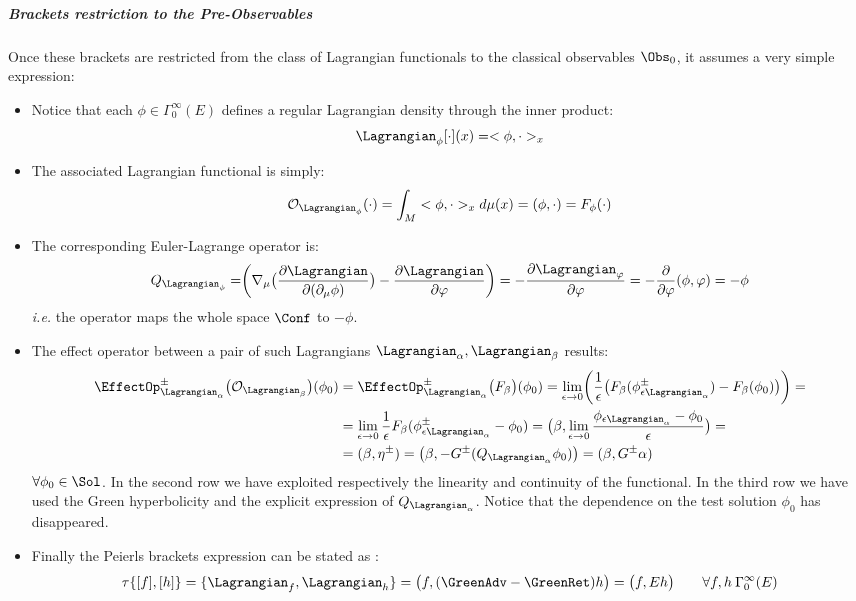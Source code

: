 \documentclass[Main]{subfiles}
\begin{document}
			\subparagraph{Brackets restriction to the Pre-Observables}
				Once these brackets are restricted from the class of Lagrangian functionals to the classical observables $\Obs_0$, it assumes a very simple expression:
				\begin{itemize}
					\item Notice that each $\phi \in \Gamma_0^\infty(E)$ defines a regular Lagrangian density through the inner product:
						\begin{displaymath}
							\Lagrangian_\phi[\cdot](x) = <\phi, \cdot>_x
						\end{displaymath}
					\item The associated Lagrangian functional is simply:
						\begin{displaymath}
							\mathcal{O}_{\Lagrangian_\phi} (\cdot ) = \int_M  <\phi, \cdot>_x d\mu(x) = (\phi, \cdot) = F_\phi (\cdot)
						\end{displaymath}
					\item The corresponding Euler-Lagrange operator is:
						\begin{displaymath}
							Q_{\Lagrangian_\phi}= \biggr( \nabla_\mu \big( \frac{\partial \Lagrangian}{\partial ( \partial_\mu \phi)} \big) - \frac{\partial \Lagrangian}{\partial \varphi} \biggr) = - \frac{\partial \Lagrangian_\varphi}{\partial \varphi} = -\frac{\partial}{\partial \varphi} (\phi, \varphi) = -\phi
						\end{displaymath}
						\textit{i.e.} the operator maps the whole space $\Conf$ to $-\phi$.
					\item The effect operator between a pair of such Lagrangians $\Lagrangian_\alpha, \Lagrangian_\beta$ results:
						\begin{align}
						\EffectOp_{\Lagrangian_\alpha}^\pm \big( \mathcal{O}_{\Lagrangian_\beta} \big) (\phi_0) &= \EffectOp_{\Lagrangian_\alpha}^\pm \big( F_\beta  \big) (\phi_0) = \lim_{\epsilon \rightarrow 0} \biggr( \frac{1}{\epsilon}\big(F_\beta ( \phi_{\epsilon \Lagrangian_\alpha}^\pm) - F_\beta(\phi_0) \big) \biggr) =\\
							&= \lim_{\epsilon \rightarrow 0} \frac{1}{\epsilon}F_\beta( \phi_{\epsilon \Lagrangian_\alpha}^\pm - \phi_0) = 
							\big(\beta, \lim_{\epsilon\rightarrow 0} \frac{ \phi_{\epsilon \Lagrangian_\alpha}  - \phi_0}{\epsilon} \big) = \\
							&=(\beta, \eta^\pm) = \big( \beta, - G^\pm (Q_{\Lagrangian_\alpha} \phi_0 ) \big) = ( \beta, G^\pm \alpha)
						\end{align}
						 $\forall 	\phi_0\in \Sol$.
						 In the second row we have exploited respectively the linearity and continuity of the functional.
						 In the third row we have used the Green hyperbolicity and the explicit expression of $Q_{\Lagrangian_\alpha}$.
						 Notice that the dependence on the test solution $\phi_0$ has disappeared.
					\item Finally the Peierls brackets expression can be stated as :
						\begin{equation}\label{Def:SymplecticTau}
							\tau\{ [f] , [h]\} = \{\Lagrangian_f , \Lagrangian_h\} = \big( f , (\GreenAdv - \GreenRet)h \big) = \big(f, E h\big) \qquad \forall f,h \: \Gamma_0^\infty (E)
						\end{equation}
				\end{itemize}
\end{document}

